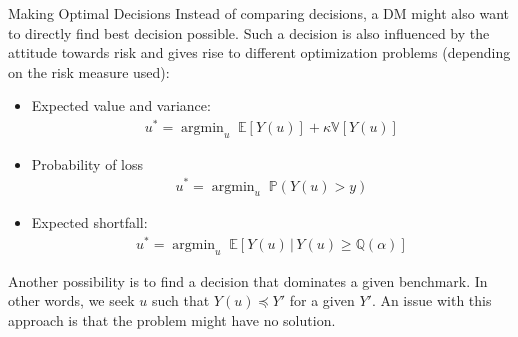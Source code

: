 \documentclass[handout,9pt]{beamer}
\begin{document}
%
\begin{frame}{Making Optimal Decisions}
Instead of comparing decisions, a DM might also want to directly find best decision possible. Such a decision is also influenced by the attitude towards risk and gives rise to different optimization problems (depending on the risk measure used):
\begin{block}{}
\begin{itemize}
\item Expected value and variance:
\begin{align*}
u^*=\mathop{\textrm{argmin}}_u\; \mathbb{E}[Y(u)]+ \kappa \mathbb{V}[Y(u)]
\end{align*}
\item Probability of loss
\begin{align*}
u^*=\mathop{\textrm{argmin}}_u\; \mathbb{P}(Y(u)>y)
\end{align*}
\item Expected shortfall: 
\begin{align*}
u^*=\mathop{\textrm{argmin}}_u\; \mathbb{E}[Y(u)\,|\,Y(u)\geq \mathbb{Q}(\alpha)]
\end{align*}
\end{itemize}
\end{block}
Another possibility is to find a decision that dominates a given benchmark. In other words, we seek $u$ such that $Y(u)\preceq Y'$ for a given $Y'$.  An issue with this approach is that the problem might have no solution. 
\end{frame}
\end{document}
